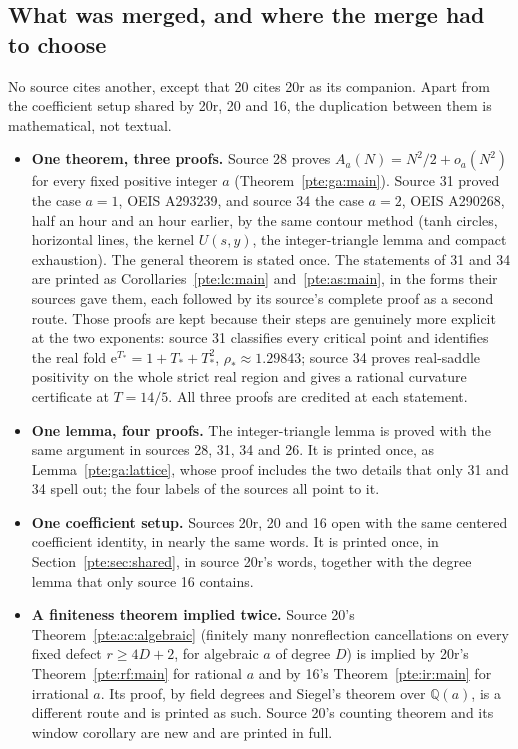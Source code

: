 \documentclass[11pt,a4paper]{article}
\numberwithin{equation}{section}
\theoremstyle{definition}
\theoremstyle{plain}
\newcommand{\ee}{\mathrm e}
\begin{document}
\subsection{What was merged, and where the merge had to choose}\label{pte:sec:merged}
No source cites another, except that 20 cites 20r as its companion. Apart from the coefficient setup shared by 20r, 20 and 16, the duplication between them is mathematical, not textual.
\begin{itemize}
\item \textbf{One theorem, three proofs.} Source 28 proves $A_a(N)=N^2/2+o_a(N^2)$ for every fixed positive integer $a$ (Theorem~\ref{pte:ga:main}). Source 31 proved the case $a=1$, OEIS A293239, and source 34 the case $a=2$, OEIS A290268, half an hour and an hour earlier, by the same contour method (tanh circles, horizontal lines, the kernel $U(s,y)$, the integer-triangle lemma and compact exhaustion). The general theorem is stated once. The statements of 31 and 34 are printed as Corollaries~\ref{pte:lc:main} and~\ref{pte:as:main}, in the forms their sources gave them, each followed by its source's complete proof as a second route. Those proofs are kept because their steps are genuinely more explicit at the two exponents: source 31 classifies every critical point and identifies the real fold $\ee^{T_*}=1+T_*+T_*^2$, $\rho_*\approx1.29843$; source 34 proves real-saddle positivity on the whole strict real region and gives a rational curvature certificate at $T=14/5$. All three proofs are credited at each statement.
\item \textbf{One lemma, four proofs.} The integer-triangle lemma is proved with the same argument in sources 28, 31, 34 and 26. It is printed once, as Lemma~\ref{pte:ga:lattice}, whose proof includes the two details that only 31 and 34 spell out; the four labels of the sources all point to it.
\item \textbf{One coefficient setup.} Sources 20r, 20 and 16 open with the same centered coefficient identity, in nearly the same words. It is printed once, in Section~\ref{pte:sec:shared}, in source 20r's words, together with the degree lemma that only source 16 contains.
\item \textbf{A finiteness theorem implied twice.} Source 20's Theorem~\ref{pte:ac:algebraic} (finitely many nonreflection cancellations on every fixed defect $r\ge4D+2$, for algebraic $a$ of degree $D$) is implied by 20r's Theorem~\ref{pte:rf:main} for rational $a$ and by 16's Theorem~\ref{pte:ir:main} for irrational $a$. Its proof, by field degrees and Siegel's theorem over $\mathbb Q(a)$, is a different route and is printed as such. Source 20's counting theorem and its window corollary are new and are printed in full.

\end{itemize}
\end{document}
